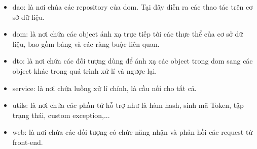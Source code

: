\begin{itemize}
    \item dao: là nơi chúa các repository của dom. Tại đây diễn ra các thao tác trên cơ sở dữ liệu.
    \item dom: là nơi chứa các object ánh xạ trực tiếp tới các thực thể của cơ sở dữ liệu, bao gồm bảng và các ràng buộc liên quan.
    \item dto: là nơi chứa các đối tượng dùng để ánh xạ các object trong dom sang các object khác trong quá trình xử lí và ngược lại.
    \item service: là nơi chứa luồng xử lí chính, là cầu nối cho tất cả.
    \item utils: là nơi chứa các phần tử hỗ trợ như là hàm hash, sinh mã Token, tập trạng thái, custom exception,...
    \item web: là nơi chứa các đối tượng có chức năng nhận và phản hồi các request từ front-end.
\end{itemize}
